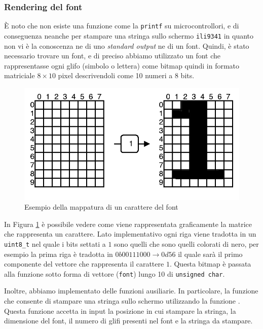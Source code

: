 \documentclass[a4paper]{article}
\begin{document}
\subsubsection{Rendering del font}

È noto che non esiste una funzione come la \texttt{printf} su microcontrollori, e di conseguenza
neanche per stampare una stringa sullo schermo \texttt{ili9341} in quanto non vi è la conoscenza
ne di uno \textit{standard output} ne di un font. Quindi, è stato necessario trovare un font,
e di preciso abbiamo utilizzato un font che rappresentasse ogni glifo (simbolo o lettera) come
bitmap quindi in formato matriciale $8 \times 10$ pixel descrivendoli come 10 numeri a 8 bits.

\begin{figure}[h!t]
    \begin{center}
        \includegraphics[scale=0.5]{./figures/matrix_font.pdf}
    \end{center}
    \caption{Esempio della mappatura di un carattere del font}
    \label{fig:matrix_font}
\end{figure}

In Figura \ref{fig:matrix_font} è possibile vedere come viene rappresentata graficamente
la matrice che rappresenta un carattere. Lato implementativo ogni riga viene tradotta in
un \texttt{uint8\_t} nel quale i bits settati a $1$ sono quelli che sono quelli colorati di nero,
per esempio la prima riga è tradotta in $0b00111000 \rightarrow 0d56$ il quale sarà il primo
componente del vettore che rappresenta il carattere $1$. Questa bitmap è passata alla
funzione
{}
sotto forma di vettore (\texttt{font}) lungo 10 di \texttt{unsigned char}.

Inoltre, abbiamo implementato delle funzioni ausiliarie. In particolare, la funzione
{}
che consente di stampare una stringa sullo schermo utilizzando la funzione
{}. Questa funzione accetta in input
la posizione in cui stampare la stringa, la dimensione del font, il numero di glifi presenti
nel font e la stringa da stampare.
\end{document}
